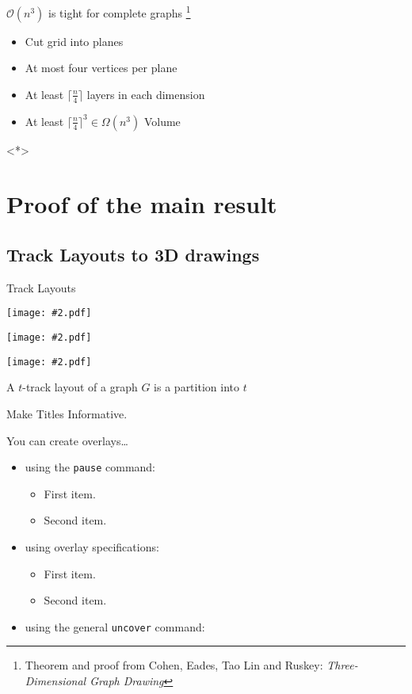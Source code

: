 \documentclass[t]{beamer}
\newcommand\still[2][1]{
    \texttt{[image: \#2.pdf]}
}
\newcommand\footcite[1]{%
  \begingroup
  \renewcommand\thefootnote{}\footnote{#1}%
  \addtocounter{footnote}{-1}%
  \endgroup
}
\begin{document}
\begin{frame}{$\mathcal O(n^3)$ is tight for complete graphs}
    \footcite{Theorem and proof from Cohen, Eades, Tao Lin and Ruskey: \textit{Three-Dimensional Graph Drawing}}
    \begin{itemize}
	\item Cut grid into planes \pause
	\item At most four vertices per plane\pause
	\item At least $\lceil\frac{n}{4}\rceil$ layers in each dimension\pause
	\item At least $\lceil\frac{n}{4}\rceil^{3} \in \Omega(n^3)$ Volume
    \end{itemize}
    \only<*>{
	\begin{center}
	\end{center}
    }
\end{frame}

\section{Proof of the main result}

\subsection{Track Layouts to 3D drawings}

\begin{frame}{Track Layouts}
    \still{static/cube}
    \still{static/cube}
    \still{static/cube}
    \begin{definition}
	A $t$-track layout of a graph $G$ is a partition into $t$ 
    \end{definition}
\end{frame}

\begin{frame}{Make Titles Informative.}

    You can create overlays\dots
    \begin{itemize}
	\item using the \texttt{pause} command:
	    \begin{itemize}
		\item
		    First item.
		    \pause
		\item    
		    Second item.
	    \end{itemize}
	\item
	    using overlay specifications:
	    \begin{itemize}
		\item<3->
		    First item.
		\item<4->
		    Second item.
	    \end{itemize}
	\item
	    using the general \texttt{uncover} command:
	    \begin{itemize}
	    \end{itemize}
    \end{itemize}
\end{frame}
\end{document}
